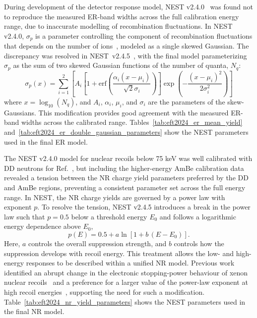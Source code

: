 During development of the detector response model, NEST v2.4.0~\cite{nest_v2_4_0} was found not to reproduce the measured ER-band widths across the full calibration energy range, due to inaccurate modelling of recombination fluctuations. In NEST v2.4.0, $\sigma_p$ is a parameter controlling the component of recombination fluctuations that depends on the  number of ions~\cite{NEST:paper_2023}, modeled as a single skewed Gaussian. The discrepancy was resolved in NEST~v2.4.5~\cite{nest_v2_4_5}, with
the final model parameterizing $\sigma_p$ as the sum of two skewed Gaussian functions of the number of quanta, $N_q$:
\begin{equation}
    \sigma_p(x) = \sum_{i=1}^2 \left[A_i\left[1 + \mathrm{erf}\left(\frac{\alpha_i (x - \mu_i) }{\sqrt{2}\sigma_i}\right)\right]\exp\left(-\frac{(x-\mu_i)^2}{2\sigma_i^2}\right)\right] 
\end{equation}
where $x = \log_{10}(N_q)$, and $A_i$, $\alpha_i$, $\mu_i$, and $\sigma_i$ are the parameters of the skew-Gaussians. This modification provides good agreement with the measured ER-band widths across the calibrated range. Tables~\ref{tab:eft2024_er_mean_yield} and~\ref{tab:eft2024_er_double_gaussian_parameters} show the NEST parameters used in the final ER model. 

The NEST v2.4.0 model for nuclear recoils below 75 keV was well calibrated with DD neutrons for Ref.~\cite{LZ:2025lowmass}, but including the higher-energy AmBe calibration data revealed a tension between the NR charge yield parameters preferred by the DD and AmBe regions, preventing a consistent parameter set across the full energy range. In NEST, the NR charge yields are governed by a power law with exponent $p$. To resolve the tension, NEST v2.4.5 introduces a break in the power law such that  $p=0.5$ below a threshold energy $E_0$ and follows a logarithmic energy dependence above $E_0$, 
\begin{equation}
    p(E)=0.5 + a \ln\!\left[1 + b\,(E - E_0)\right].
\end{equation}
Here, $a$ controls the overall suppression strength, and $b$ controls how the suppression develops with recoil energy.
This treatment allows the low- and high-energy responses to be described within a unified NR model.
Previous work identified an abrupt change in the electronic stopping-power behaviour of xenon nuclear recoils~\cite{Aprile:2006} and a preference for a larger value of the power-law exponent at high recoil energies~\cite{Lenardo:2015}, supporting the need for such a modification. Table~\ref{tab:eft2024_nr_yield_parameters} shows the NEST parameters used in the final NR model. 



